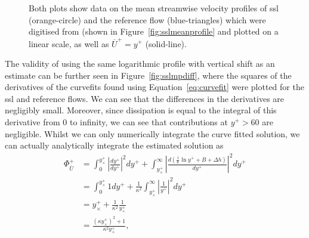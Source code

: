 \begin{figure}[htbp]
	\centering
		\caption[Mean streamwise velocity profiles of SSL and reference flows, and analytical approximations thereof]{Both plots show data on the mean streamwise velocity profiles of \gls*{ssl} (orange-circle) and the reference flow (blue-triangles) which were digitised from \textcite{viotti2009} (shown in Figure~\ref{fig:sslmeanprofile} and plotted on a linear scale, as well as $\overline{U}^+=y^+$ (solid-line). }
	\label{fig:sslmplin}
\end{figure}
The validity of using the same logarithmic profile with vertical shift as an estimate can be further seen in Figure~\ref{fig:sslmpdiff}, where the squares of the derivatives of the curvefits found using Equation~\eqref{eq:curvefit} were plotted for the \gls*{ssl} and reference flows. We can see that the differences in the derivatives are negligibly small. Moreover, since dissipation is equal to the integral of this derivative from 0 to infinity, we can see that contributions at $y^{+}>60$ are negligible. Whilst we can only numerically integrate the curve fitted solution, we can actually analytically integrate the estimated solution as
\begin{align}
	\Phi _{\overline{U}}^{+} &= \int_{0}^{y_{\times}^{+}} \left| \frac{dy^{+}}{dy^{+}} \right|^2dy^{+} + \int_{y_{\times}^{+}}^{\infty} \left| \frac{d\left( \frac{1}{\kappa}\ln y^{+} +B+\Delta h\right) }{dy^{+}} \right|^2dy^{+}  \\
	&= \int_{0}^{y_{\times}^{+}} 1dy^{+} + \frac{1}{\kappa^2}\int_{y_{\times}^{+}}^{\infty} \left| \frac{1}{y^{+}} \right|^2dy^{+}  \\
	&= y_{\times}^{+} + \frac{1}{\kappa^2}\frac{1}{y_{\times}^{+}}\\
	&=\frac{\left(  \kappa y_{\times}^{+}  \right) ^2+ 1}{\kappa^2 y_{\times}^{+}}\label{eq:fiycross}
,\end{align}
